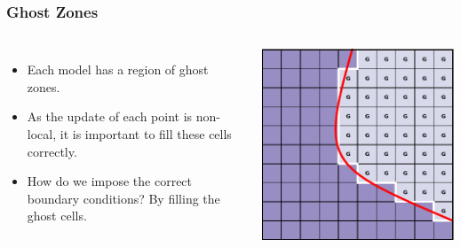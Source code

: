 \documentclass{beamer}
\begin{document}
\begin{frame}
\frametitle{Ghost Zones}
\begin{columns}
\begin{itemize}x
\item{Each model has a region of ghost zones.}
\item{As the update of each point is non-local, it is important to fill these cells correctly.}
\item{How do we impose the correct boundary conditions? By filling the ghost cells.}
\end{itemize}
\includegraphics[width=\textwidth]{../images/multimodel_ghostcells.pdf}
\end{columns}
\end{frame}
\end{document}
